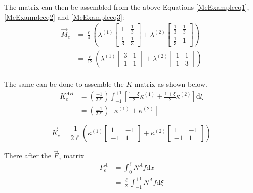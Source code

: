  The matrix can then be assembled from the above Equations \ref{MeExampleeq1},\ref{MeExampleeq2} and \ref{MeExampleeq3}:
\begin{equation}%
\begin{aligned}
\vec{M}_e &= \frac{\ell}{4} \left(
	\lambda^{(1)} \begin{bmatrix} 1 & \frac{1}{3} \\ \frac{1}{3} & \frac{1}{3} \end{bmatrix}
	+ \lambda^{(2)} \begin{bmatrix} \frac{1}{3} & \frac{1}{3} \\ \frac{1}{3} & 1 \end{bmatrix}
\right) \\
&= \frac{\ell}{12} \left(
	\lambda^{(1)} \begin{bmatrix} 3 & 1 \\ 1 & 1 \end{bmatrix}
	+ \lambda^{(2)} \begin{bmatrix} 1 & 1 \\ 1 & 3 \end{bmatrix}
\right) \\
\end{aligned}
\end{equation}

The same can be done to assemble the $K$ matrix as shown below.
\begin{equation}%
\begin{aligned}
K_e^{AB} &= \left(\frac{\pm 1}{2\ell}\right) \int_{-1}^{+1} \left[
	\frac{1-\xi}{2} \kappa^{(1)}
	+ \frac{1+\xi}{2} \kappa^{(2)}
\right] \text{d}\xi \\
&= \left(\frac{\pm 1}{2\ell}\right) \left[ \kappa^{(1)} + \kappa^{(2)} \right]
\end{aligned}
\end{equation}


\begin{equation}%
\vec{K}_e = \frac{1}{2\ell} \left(
	\kappa^{(1)} \begin{bmatrix} 1 & -1 \\ -1 & 1 \end{bmatrix}
	+ \kappa^{(2)} \begin{bmatrix} 1 & -1 \\ -1 & 1 \end{bmatrix}
\right)
\end{equation}

There after the $\vec{F}_e$ matrix
\begin{equation}%
\begin{aligned}
F_e^A &= \int_0^\ell N^A f \text{d}x \\
&= \frac{\ell}{2} \int_{-1}^{+1} N^A f \text{d} \xi
\end{aligned}
\end{equation}


